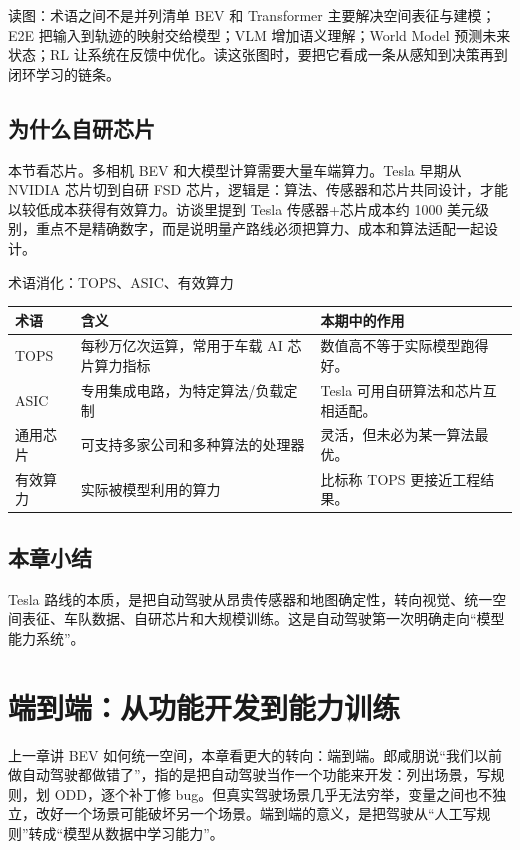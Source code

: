\documentclass[a4paper]{article}
\begin{document}
\begin{knowledgebox}{读图：术语之间不是并列清单}
BEV 和 Transformer 主要解决空间表征与建模；E2E 把输入到轨迹的映射交给模型；VLM 增加语义理解；World Model 预测未来状态；RL 让系统在反馈中优化。读这张图时，要把它看成一条从感知到决策再到闭环学习的链条。
\end{knowledgebox}

\subsection{为什么自研芯片}

本节看芯片。多相机 BEV 和大模型计算需要大量车端算力。Tesla 早期从 NVIDIA 芯片切到自研 FSD 芯片，逻辑是：算法、传感器和芯片共同设计，才能以较低成本获得有效算力。访谈里提到 Tesla 传感器+芯片成本约 1000 美元级别，重点不是精确数字，而是说明量产路线必须把算力、成本和算法适配一起设计。

\begin{knowledgebox}{术语消化：TOPS、ASIC、有效算力}
\noindent\begin{tabularx}{\textwidth}{p{}p{}X}
\toprule
术语 & 含义 & 本期中的作用 \\
\midrule
TOPS & 每秒万亿次运算，常用于车载 AI 芯片算力指标 & 数值高不等于实际模型跑得好。 \\
ASIC & 专用集成电路，为特定算法/负载定制 & Tesla 可用自研算法和芯片互相适配。 \\
通用芯片 & 可支持多家公司和多种算法的处理器 & 灵活，但未必为某一算法最优。 \\
有效算力 & 实际被模型利用的算力 & 比标称 TOPS 更接近工程结果。 \\
\bottomrule
\end{tabularx}
\end{knowledgebox}

\subsection{本章小结}

Tesla 路线的本质，是把自动驾驶从昂贵传感器和地图确定性，转向视觉、统一空间表征、车队数据、自研芯片和大规模训练。这是自动驾驶第一次明确走向“模型能力系统”。

\section{端到端：从功能开发到能力训练}

上一章讲 BEV 如何统一空间，本章看更大的转向：端到端。郎咸朋说“我们以前做自动驾驶都做错了”，指的是把自动驾驶当作一个功能来开发：列出场景，写规则，划 ODD，逐个补丁修 bug。但真实驾驶场景几乎无法穷举，变量之间也不独立，改好一个场景可能破坏另一个场景。端到端的意义，是把驾驶从“人工写规则”转成“模型从数据中学习能力”。
\end{document}
